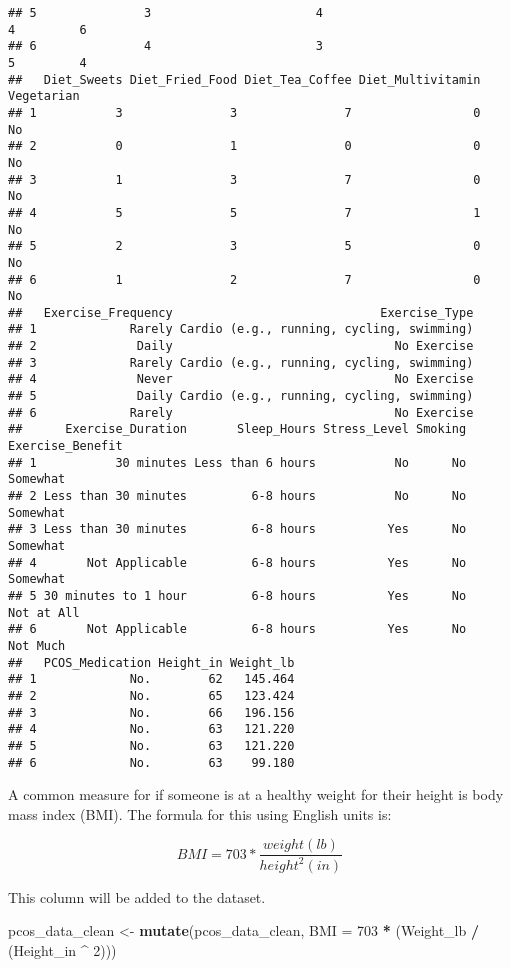 \documentclass[
]{article}
\newenvironment{Shaded}{\begin{snugshade}}{\end{snugshade}}
\newcommand{\AttributeTok}[1]{\textcolor[rgb]{0.13,0.29,0.53}{#1}}
\newcommand{\DecValTok}[1]{\textcolor[rgb]{0.00,0.00,0.81}{#1}}
\newcommand{\FunctionTok}[1]{\textcolor[rgb]{0.13,0.29,0.53}{\textbf{#1}}}
\newcommand{\NormalTok}[1]{#1}
\newcommand{\OtherTok}[1]{\textcolor[rgb]{0.56,0.35,0.01}{#1}}
\newcommand{\SpecialCharTok}[1]{\textcolor[rgb]{0.81,0.36,0.00}{\textbf{#1}}}
\begin{document}
\begin{verbatim}
## 5               3                       4                          4         6
## 6               4                       3                          5         4
##   Diet_Sweets Diet_Fried_Food Diet_Tea_Coffee Diet_Multivitamin Vegetarian
## 1           3               3               7                 0         No
## 2           0               1               0                 0         No
## 3           1               3               7                 0         No
## 4           5               5               7                 1         No
## 5           2               3               5                 0         No
## 6           1               2               7                 0         No
##   Exercise_Frequency                             Exercise_Type
## 1             Rarely Cardio (e.g., running, cycling, swimming)
## 2              Daily                               No Exercise
## 3             Rarely Cardio (e.g., running, cycling, swimming)
## 4              Never                               No Exercise
## 5              Daily Cardio (e.g., running, cycling, swimming)
## 6             Rarely                               No Exercise
##      Exercise_Duration       Sleep_Hours Stress_Level Smoking Exercise_Benefit
## 1           30 minutes Less than 6 hours           No      No         Somewhat
## 2 Less than 30 minutes         6-8 hours           No      No         Somewhat
## 3 Less than 30 minutes         6-8 hours          Yes      No         Somewhat
## 4       Not Applicable         6-8 hours          Yes      No         Somewhat
## 5 30 minutes to 1 hour         6-8 hours          Yes      No       Not at All
## 6       Not Applicable         6-8 hours          Yes      No         Not Much
##   PCOS_Medication Height_in Weight_lb
## 1             No.        62   145.464
## 2             No.        65   123.424
## 3             No.        66   196.156
## 4             No.        63   121.220
## 5             No.        63   121.220
## 6             No.        63    99.180
\end{verbatim}

A common measure for if someone is at a healthy weight for their height
is body mass index (BMI). The formula for this using English units is:

\[
BMI = 703 * \frac{weight (lb)}{height^2 (in)}
\]

This column will be added to the dataset.

\begin{Shaded}
\begin{Highlighting}[]
\NormalTok{pcos\_data\_clean }\OtherTok{\textless{}{-}} \FunctionTok{mutate}\NormalTok{(pcos\_data\_clean, }\AttributeTok{BMI =} \DecValTok{703} \SpecialCharTok{*}\NormalTok{ (Weight\_lb }\SpecialCharTok{/}\NormalTok{ (Height\_in }\SpecialCharTok{\^{}} \DecValTok{2}\NormalTok{)))}
\end{Highlighting}
\end{Shaded}
\end{document}
